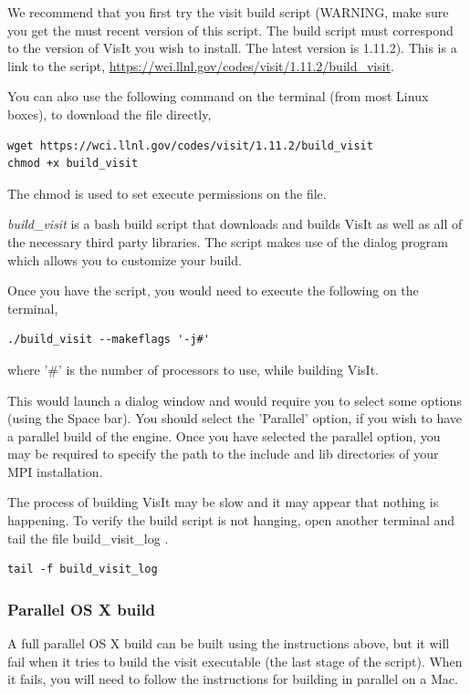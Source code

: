 \documentclass[12pt]{article}
\begin{document}
We recommend that you first try the visit build script (WARNING, make
sure you get the must recent version of this script. The build script
must correspond to the version of VisIt you wish to install. The
latest version is 1.11.2). This is a link to the script,
\url{https://wci.llnl.gov/codes/visit/1.11.2/build\_visit}.

You can also use the following command on the terminal (from most
Linux boxes), to download the file directly,

\begin{verbatim}
wget https://wci.llnl.gov/codes/visit/1.11.2/build_visit
chmod +x build_visit
\end{verbatim}
The chmod is used to set execute permissions on the file.

\emph{build\_visit} is a bash build script that downloads and builds VisIt as
well as all of the necessary third party libraries. The script makes
use of the dialog program which allows you to customize your build.

Once you have the script, you would need to execute the following on
the terminal,

\begin{verbatim}
./build_visit --makeflags '-j#'
\end{verbatim}
where '\#' is the number of processors to use, while building VisIt.

This would launch a dialog window and would require you to select some
options (using the Space bar). You should select the 'Parallel'
option, if you wish to have a parallel build of the engine. Once you
have selected the parallel option, you may be required to specify the
path to the include and lib directories of your MPI installation.

The process of building VisIt may be slow and it may appear that
nothing is happening. To verify the build script is not hanging, open
another terminal and tail the file build\_visit\_log .

\begin{verbatim}
tail -f build_visit_log
\end{verbatim}

\normalfont  
\subsubsection{Parallel OS X build}
\label{sec:ParallelOSXBuild}

A full parallel OS X build can be built using the instructions above,
but it will fail when it tries to build the visit executable (the last
stage of the script). When it fails, you will need to follow the
instructions for building in parallel on a Mac.
\end{document}
